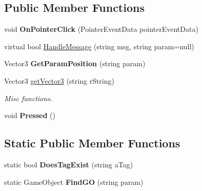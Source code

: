 \subsection*{Public Member Functions}
\begin{DoxyCompactItemize}
\item 
void {\bfseries On\+Pointer\+Click} (Pointer\+Event\+Data pointer\+Event\+Data)\hypertarget{class_object_message_handler_base_a547d53f8da348b092391b08357aefe4e}{}\label{class_object_message_handler_base_a547d53f8da348b092391b08357aefe4e}

\item 
virtual bool \hyperlink{group___o_m_h___commands_ga86c01c29831daf58f5b0ecc3ce65ee58}{Handle\+Message} (string msg, string param=null)
\item 
Vector3 {\bfseries Get\+Param\+Position} (string param)\hypertarget{class_object_message_handler_base_a0d9632b2fff9d1c7a47b4bd5f074a6f4}{}\label{class_object_message_handler_base_a0d9632b2fff9d1c7a47b4bd5f074a6f4}

\item 
Vector3 \hyperlink{class_object_message_handler_base_a0d628fca15cd568afefc64aa21a141e0}{get\+Vector3} (string r\+String)\hypertarget{class_object_message_handler_base_a0d628fca15cd568afefc64aa21a141e0}{}\label{class_object_message_handler_base_a0d628fca15cd568afefc64aa21a141e0}

\begin{DoxyCompactList}\small\item\em Misc functions. \end{DoxyCompactList}\item 
void {\bfseries Pressed} ()\hypertarget{class_object_message_handler_base_a45b7e97f69be20abf60c436a0367b52f}{}\label{class_object_message_handler_base_a45b7e97f69be20abf60c436a0367b52f}

\end{DoxyCompactItemize}
\subsection*{Static Public Member Functions}
\begin{DoxyCompactItemize}
\item 
static bool {\bfseries Does\+Tag\+Exist} (string a\+Tag)\hypertarget{class_object_message_handler_base_a728f69f665be17daeb794074743da0f6}{}\label{class_object_message_handler_base_a728f69f665be17daeb794074743da0f6}

\item 
static Game\+Object {\bfseries Find\+GO} (string param)\hypertarget{class_object_message_handler_base_abf49342680f29b4710defba6027ba0e3}{}\label{class_object_message_handler_base_abf49342680f29b4710defba6027ba0e3}

\end{DoxyCompactItemize}

